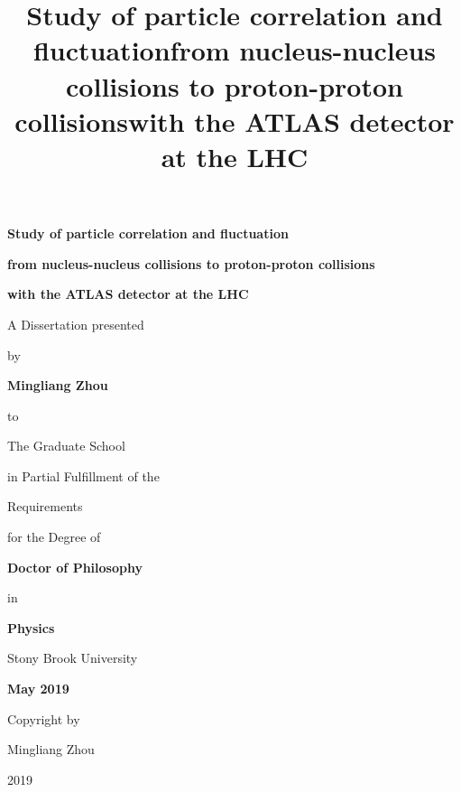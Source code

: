 \documentclass[12pt]{article}
\begin{document}
\title{\bf{Study of particle correlation and fluctuation}}
\title{\bf{from nucleus-nucleus collisions to proton-proton collisions}}
\title{\bf{with the ATLAS detector at the LHC}}

\vspace*{3\baselineskip}
\centerline{\bf{Study of particle correlation and fluctuation}}
\centerline{\bf{from nucleus-nucleus collisions to proton-proton collisions}}
\centerline{\bf{with the ATLAS detector at the LHC}}
\vspace*{1\baselineskip}
\centerline{A Dissertation presented}
\vspace*{1\baselineskip}
\centerline{by} 
\vspace*{1\baselineskip}
\centerline{\bf{Mingliang Zhou}}
\vspace*{1\baselineskip}
\centerline{to} 
\vspace*{1\baselineskip}
\centerline{The Graduate School}
\vspace*{1\baselineskip}
\centerline{in Partial Fulfillment of the}
\vspace*{1\baselineskip}
\centerline{Requirements}
\vspace*{1\baselineskip}
\centerline{for the Degree of}
\vspace*{1\baselineskip}
\centerline{\bf{Doctor of Philosophy}}
\vspace*{1\baselineskip}
\centerline{in}
\vspace*{1\baselineskip}
\centerline{\bf{Physics}}
\vspace*{2\baselineskip}
\centerline{Stony Brook University}
\vspace*{2\baselineskip}
\centerline{\bf{May 2019}}

\newpage
{}

\vspace*{32\baselineskip}
\vspace*{1\baselineskip}
\centerline{Copyright by}
\centerline{Mingliang Zhou}
\centerline{2019}

\newpage
{}
\setcounter{page}{2}
\end{document}
